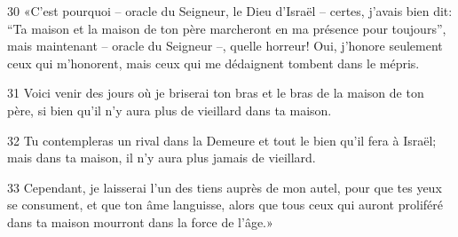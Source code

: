 
30 «C’est pourquoi – oracle du Seigneur, le Dieu d’Israël – certes, j’avais bien dit: “Ta maison et la maison de ton père marcheront en ma présence pour toujours”, mais maintenant – oracle du Seigneur –, quelle horreur! Oui, j’honore seulement ceux qui m’honorent, mais ceux qui me dédaignent tombent dans le mépris.

31 Voici venir des jours où je briserai ton bras et le bras de la maison de ton père, si bien qu’il n’y aura plus de vieillard dans ta maison.

32 Tu contempleras un rival dans la Demeure et tout le bien qu’il fera à Israël; mais dans ta maison, il n’y aura plus jamais de vieillard.

33 Cependant, je laisserai l’un des tiens auprès de mon autel, pour que tes yeux se consument, et que ton âme languisse, alors que tous ceux qui auront proliféré dans ta maison mourront dans la force de l’âge.»